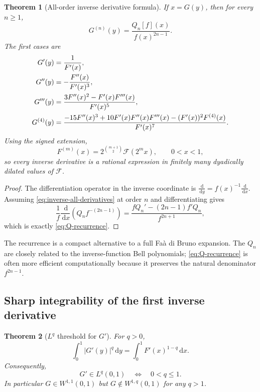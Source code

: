 \documentclass[11pt,oneside]{article}
\newtheorem{theorem}{Theorem}[section]
\theoremstyle{definition}
\theoremstyle{remark}
\newcommand{\dd}{\,\mathrm d}
\begin{document}
\begin{theorem}[All-order inverse derivative formula]\label{thm:inverse-all-derivatives}
If $x=G(y)$, then for every $n\ge1$,
\begin{equation}\label{eq:inverse-all-derivatives}
\boxed{
 G^{(n)}(y)=\frac{Q_n[f](x)}{f(x)^{2n-1}}.}
\end{equation}
The first cases are
\begin{align}
 G'(y)&=\frac1{F'(x)},\notag\\
 G''(y)&=-\frac{F''(x)}{F'(x)^3},\notag\\
 G'''(y)&=\frac{3F''(x)^2-F'(x)F'''(x)}{F'(x)^5},\label{eq:inverse-first-derivatives}\\
 G^{(4)}(y)&=\frac{-15F''(x)^3+10F'(x)F''(x)F'''(x)
 -(F'(x))^2F^{(4)}(x)}{F'(x)^7}.
\end{align}
Using the signed extension,
\begin{equation}\label{eq:forward-derivative-dilation}
 F^{(m)}(x)=2^{\binom{m+1}{2}}\mathcal F(2^mx),
 \qquad 0<x<1,
\end{equation}
so every inverse derivative is a rational expression in finitely many dyadically dilated values of $\mathcal F$.
\end{theorem}

\begin{proof}
The differentiation operator in the inverse coordinate is
$\frac{\dd}{\dd y}=f(x)^{-1}\frac{\dd}{\dd x}$.  Assuming \eqref{eq:inverse-all-derivatives} at order $n$ and differentiating gives
\[
 \frac1f\frac{\dd}{\dd x}\left(Q_nf^{-(2n-1)}\right)
 =\frac{fQ_n'-(2n-1)f'Q_n}{f^{2n+1}},
\]
which is exactly \eqref{eq:Q-recurrence}.
\end{proof}

The recurrence is a compact alternative to a full Fa\`a di Bruno expansion.  The $Q_n$ are closely related to the inverse-function Bell polynomials; \eqref{eq:Q-recurrence} is often more efficient computationally because it preserves the natural denominator $f^{2n-1}$.

\subsection{Sharp integrability of the first inverse derivative}

\begin{theorem}[$L^q$ threshold for $G'$]\label{thm:Gprime-Lq}
For $q>0$,
\begin{equation}\label{eq:Gprime-Lq-change}
 \int_0^1|G'(y)|^q\dd y
 =\int_0^1F'(x)^{1-q}\dd x.
\end{equation}
Consequently,
\begin{equation}\label{eq:Gprime-Lq-threshold}
 G'\in L^q(0,1)
 \quad\Longleftrightarrow\quad 0<q\le1.
\end{equation}
In particular $G\in W^{1,1}(0,1)$ but $G\notin W^{1,q}(0,1)$ for any $q>1$.
\end{theorem}
\end{document}
